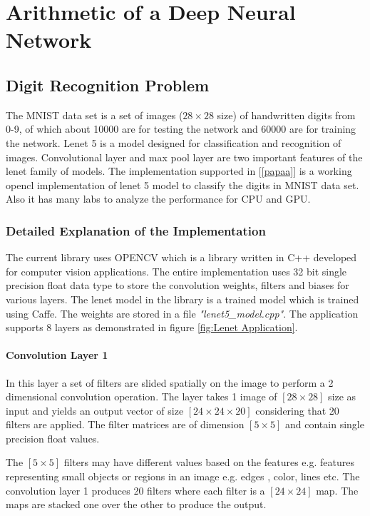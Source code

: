 \chapter{Arithmetic of a Deep Neural Network}\label{Chapter5}
\section {Digit Recognition Problem}
The MNIST data set is a set of images ($28\times 28$ size) of handwritten digits from 0-9, of which about 10000 are for testing the network and 60000 are for training the network.
Lenet 5 is a model designed for classification and recognition of images.
Convolutional layer and max pool layer are two important features of the lenet family of models.
The implementation supported in [\ref{papaa}] is a working opencl implementation of lenet 5 model to classify the digits in MNIST data set. Also it has many labs to analyze the performance for CPU and GPU.
\subsection{Detailed Explanation of the Implementation}
The current library uses OPENCV which is a library written in C++ developed for computer vision applications. The entire implementation uses 32 bit single precision float data type to store the convolution weights, filters and biases for various layers. The lenet model in the library is a trained model which is trained using Caffe. The weights are stored in a file \textit{"lenet5\_model.cpp"}.
The application supports 8 layers as demonstrated in figure \ref{fig:Lenet Application}. %


\subsubsection{Convolution Layer 1}\label{Convolution layer 1}
In this layer a set of filters are slided spatially on the image to perform a 2 dimensional convolution operation. The layer takes 1 image of $[28\times 28]$ size as input and yields an output vector of size $[24\times 24 \times 20]$ considering that 20 filters are applied. The filter matrices are of dimension $[5\times 5]$ and contain single precision float values. 

\noindent The $[5\times 5]$ filters may have different values based on the features e.g. features representing small objects or regions in  an image e.g. edges , color, lines etc. The convolution layer 1 produces 20 filters where each filter is a $[24\times 24]$ map. The maps are stacked one over the other to produce the output.
